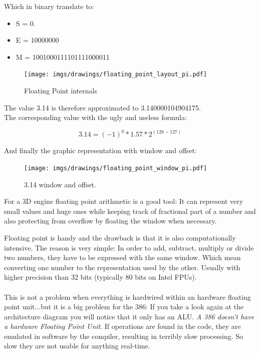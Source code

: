 \documentclass[book.tex]{subfiles}
\begin{document}
Which in binary translate to:

\begin{itemize}
\item S = 0.
\item E = 10000000
\item M = 1001000111101111000011
\end{itemize}

\begin{figure}[H]
\centering
\texttt{[image: imgs/drawings/floating\_point\_layout\_pi.pdf]}
\caption{Floating Point internals}
\label{fig:fp_internals}
\end{figure}
  \bigskip

The value 3.14 is therefore approximated to 3.140000104904175.\\

The corresponding value with the ugly and useless formula:

\begin{equation}
3.14 = (-1)^0 * 1.57 * 2^{(128-127)}
\end{equation}

\bigskip

And finally the graphic representation with window and offset:\\

\begin{figure}[H]
\centering
\texttt{[image: imgs/drawings/floating\_point\_window\_pi.pdf]}

\caption{3.14 window and offset.}
\label{fig:fp_internals}
\end{figure}
  \bigskip

For a 3D engine floating point arithmetic is a good tool: It can represent very small values and huge ones while keeping track of fractional part of a number and also protecting from overflow by floating the window when necessary.\\
\par
Floating point is handy and the drawback is that it is also computationally intensive. The reason is very simple: In order to add, subtract, multiply or divide two numbers, they have to be expressed with the same window. Which mean converting one number to the representation used by the other. Usually with higher precision than 32 bits (typically 80 bits on Intel FPUs).\\
\\
This is not a problem when everything is hardwired within an hardware floating point unit...but it is a big problem for the 386: If you take a look again at the architecture diagram you will notice that it only has an ALU. \emph{A 386 doesn't have a hardware Floating Point Unit}. If  operations are found in the code, they are emulated in software by the compiler, resulting in terribly slow processing. So slow they are not usable for anything real-time.\\ 
\par
\end{document}

